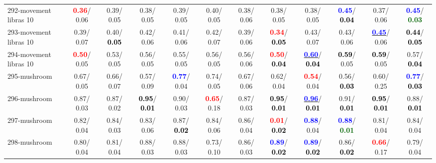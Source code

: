 \begin{table}[h]
\begin{center}
{\begin{tabular}{lc|c|c|c|c|c|c|c|c|c|c}
292-movement libras 10 & \textcolor{red}{\textbf{  0.36}}/  0.06 &   0.39/  0.05 &   0.38/  0.05 &   0.39/  0.05 &   0.40/  0.05 &   0.38/  0.06 &   0.38/  0.05 &   0.38/  0.05 & \textcolor{blue}{\textbf{  0.45}}/\textcolor{black}{\textbf{  0.04}} &   0.37/  0.06 & \textcolor{blue}{\textbf{  0.45}}/\textcolor{darkgreen}{\textbf{  0.03}} \\
293-movement libras 10 &   0.39/  0.07 &   0.40/\textcolor{black}{\textbf{  0.05}} &   0.42/  0.06 &   0.41/  0.06 &   0.42/  0.07 &   0.39/  0.06 & \textcolor{red}{\textbf{  0.34}}/\textcolor{black}{\textbf{  0.05}} &   0.43/  0.07 &   0.43/  0.06 & \underline{\textcolor{blue}{\textbf{  0.45}}}/  0.06 & \textcolor{black}{\textbf{  0.44}}/\textcolor{black}{\textbf{  0.05}} \\
294-movement libras 10 & \textcolor{red}{\textbf{  0.50}}/  0.05 &   0.53/  0.05 &   0.56/  0.05 &   0.55/  0.05 &   0.56/  0.05 &   0.56/  0.06 & \textcolor{red}{\textbf{  0.50}}/\textcolor{black}{\textbf{  0.04}} & \underline{\textcolor{blue}{\textbf{  0.60}}}/\textcolor{black}{\textbf{  0.04}} & \textcolor{black}{\textbf{  0.59}}/  0.05 & \textcolor{black}{\textbf{  0.59}}/  0.05 &   0.57/\textcolor{black}{\textbf{  0.04}} \\
295-mushroom &   0.67/  0.05 &   0.66/  0.07 &   0.57/  0.09 & \textcolor{blue}{\textbf{  0.77}}/  0.04 &   0.74/  0.05 &   0.67/  0.06 &   0.62/  0.04 & \textcolor{red}{\textbf{  0.54}}/  0.04 &   0.56/\textcolor{black}{\textbf{  0.03}} &   0.60/  0.25 & \textcolor{blue}{\textbf{  0.77}}/\textcolor{black}{\textbf{  0.03}} \\ \hline
296-mushroom &   0.87/  0.03 &   0.87/  0.02 & \textcolor{black}{\textbf{  0.95}}/\textcolor{black}{\textbf{  0.01}} &   0.90/  0.03 & \textcolor{red}{\textbf{  0.65}}/  0.18 &   0.87/  0.03 & \textcolor{black}{\textbf{  0.95}}/\textcolor{black}{\textbf{  0.01}} & \underline{\textcolor{blue}{\textbf{  0.96}}}/\textcolor{black}{\textbf{  0.01}} &   0.91/\textcolor{black}{\textbf{  0.01}} & \textcolor{black}{\textbf{  0.95}}/\textcolor{black}{\textbf{  0.01}} &   0.88/\textcolor{black}{\textbf{  0.01}} \\
297-mushroom &   0.82/  0.04 &   0.84/  0.03 &   0.83/  0.06 &   0.87/\textcolor{black}{\textbf{  0.02}} &   0.84/  0.06 &   0.86/  0.04 & \textcolor{red}{\textbf{  0.01}}/\textcolor{black}{\textbf{  0.02}} & \textcolor{blue}{\textbf{  0.88}}/  0.04 & \textcolor{blue}{\textbf{  0.88}}/\textcolor{darkgreen}{\textbf{  0.01}} &   0.81/  0.04 &   0.84/  0.04 \\
298-mushroom &   0.80/  0.04 &   0.81/  0.04 &   0.88/  0.03 &   0.88/  0.03 &   0.73/  0.10 &   0.86/  0.03 & \textcolor{blue}{\textbf{  0.89}}/\textcolor{black}{\textbf{  0.02}} & \textcolor{blue}{\textbf{  0.89}}/\textcolor{black}{\textbf{  0.02}} &   0.86/\textcolor{black}{\textbf{  0.02}} & \textcolor{red}{\textbf{  0.66}}/  0.17 &   0.79/  0.04 \\

\end{tabular}}
\end{center}
\end{table}
